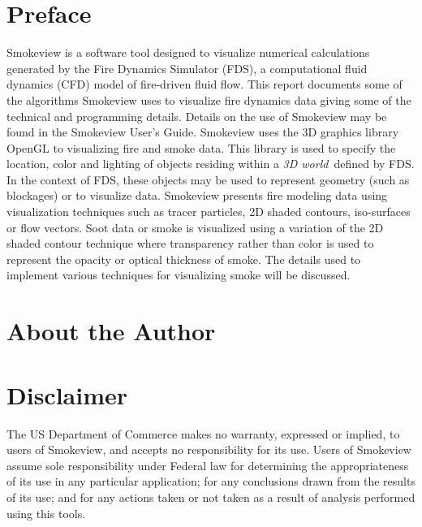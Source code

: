 \documentclass[11pt,twoside]{book}
\begin{document}
\chapter{Preface}
Smokeview is a software tool designed to visualize numerical
calculations generated by the Fire Dynamics Simulator (FDS),
a computational fluid dynamics (CFD) model of fire-driven fluid
flow. This report documents some of the algorithms Smokeview uses to visualize fire dynamics data giving some of the technical and programming details.
Details on the use of Smokeview may be found in the Smokeview User's
Guide.
Smokeview uses the 3D graphics library OpenGL to visualizing fire and smoke data.
This library is
used to specify the location, color and
lighting of objects residing within a {\em 3D world}\ defined by FDS.
In the context of FDS, these objects
may be used to represent geometry (such as blockages) or to
visualize data. Smokeview presents fire modeling data using visualization techniques
such as tracer particles, 2D shaded contours, iso-surfaces or flow vectors.  Soot data or
smoke is visualized using a variation of the 2D shaded contour technique where transparency rather than color is used to represent
the opacity or optical thickness of smoke.  The details used to implement various
techniques for visualizing smoke will be discussed.


\chapter{About the Author}

\begin{description}

\end{description}

%
%

\chapter{Disclaimer}

The US Department of Commerce makes no warranty,
expressed or implied, to users of Smokeview, and accepts no
responsibility for its use. Users of Smokeview assume sole
responsibility under Federal law for determining the
appropriateness of its use in any particular application; for any
conclusions drawn from the results of its use; and for any actions
taken or not taken as a result of analysis performed using this
tools.
\end{document}
